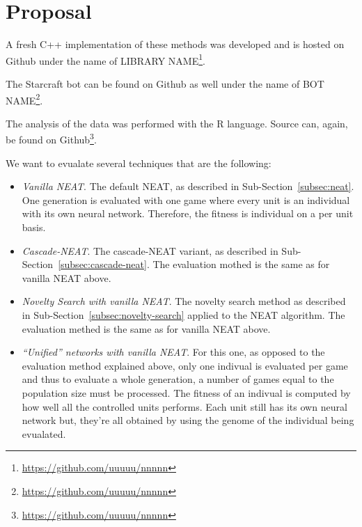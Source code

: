 \section{Proposal}\label{section:proposal}

A fresh C++ implementation of these methods was developed and is hosted on Github under the name of LIBRARY
NAME\footnote{\url{https://github.com/uuuuu/nnnnn}}.%

The Starcraft bot can be found on Github as well under the name of
BOT NAME\footnote{\url{https://github.com/uuuuu/nnnnn}}.%

The analysis of the data was performed with the R language. Source can, again,
be found on Github\footnote{\url{https://github.com/uuuuu/nnnnn}}.%

We want to evualate several techniques that are the following:
\begin{itemize}
    \item \emph{Vanilla NEAT}. The default NEAT, as described in Sub-Section~\ref{subsec:neat}. One generation is evaluated with one game
        where every unit is an individual with its own neural network. Therefore, the fitness is individual on a per unit basis.
    \item \emph{Cascade-NEAT}. The cascade-NEAT variant, as described in Sub-Section~\ref{subsec:cascade-neat}.
        The evaluation mothed is the same as for vanilla NEAT above.
    \item \emph{Novelty Search with vanilla NEAT}. The novelty search method as described in Sub-Section~\ref{subsec:novelty-search} applied to the NEAT algorithm.
        The evaluation methed is the same as for vanilla NEAT above.
    \item \emph{``Unified'' networks with vanilla NEAT}. For this one, as opposed to the evaluation method explained above, only one indivual is
        evaluated per game and thus to evaluate a whole generation, a number of games equal to the population size must be processed.
        The fitness of an indivual is computed by how well all the controlled units performs. Each unit still has its own neural network
        but, they're all obtained by using the genome of the individual being evualated.
\end{itemize}

